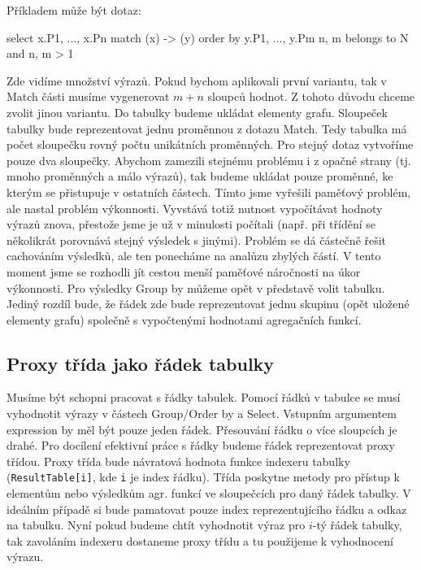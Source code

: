 \clearpage

Příkladem může být dotaz: 
\begin{code}
select x.P1, ..., x.Pn match (x) -> (y) order by y.P1, ..., y.Pm  
n, m belongs to N and n, m > 1
\end{code}

Zde vidíme množství výrazů.
Pokud bychom aplikovali první variantu, tak v Match části musíme vygenerovat $m + n$ sloupců hodnot.
Z tohoto důvodu chceme zvolit jinou variantu.
Do tabulky budeme ukládat elementy grafu.
Sloupeček tabulky bude reprezentovat jednu proměnnou z dotazu Match.
Tedy tabulka má počet sloupečku rovný počtu unikátních proměnných. 
Pro stejný dotaz vytvoříme pouze dva sloupečky.
Abychom zamezili stejnému problému i z opačné strany (tj. mnoho proměnných a málo výrazů), tak budeme ukládat pouze proměnné, ke kterým se přistupuje v ostatních částech.
Tímto jsme vyřešili paměťový problém, ale nastal problém výkonnosti.
Vyvstává totiž nutnost vypočítávat hodnoty výrazů znova, přestože jsme je už v minulosti počítali (např. při třídění se několikrát porovnává stejný výsledek s jinými).
Problém se dá částečně řešit cachováním výsledků, ale ten ponecháme na analůzu zbylých částí.
V tento moment jsme se rozhodli jít cestou menší paměťové náročnosti na úkor výkonnosti.
Pro výsledky Group by můžeme opět v představě volit tabulku.
Jediný rozdíl bude, že řádek zde bude reprezentovat jednu skupinu (opět uložené elementy grafu) společně s vypočtenými hodnotami agregačních funkcí.

\subsection{Proxy třída jako řádek tabulky}

Musíme být schopni pracovat s řádky tabulek.
Pomocí řádků v tabulce se musí vyhodnotit výrazy v částech Group/Order by a Select.
Vstupním argumentem expression by měl být pouze jeden řádek.
Přesouvání řádku o více sloupcích je drahé.
Pro docílení efektivní práce s řádky budeme řádek reprezentovat proxy třídou.
Proxy třída bude návratová hodnota funkce indexeru tabulky (\texttt{ResultTable[i]}, kde \texttt{i} je index řádku).
Třída poskytne metody pro přístup k elementům nebo výsledkům agr. funkcí ve sloupečcích pro daný řádek tabulky.
V ideálním případě si bude pamatovat pouze index reprezentujícího řádku a odkaz na tabulku.
Nyní pokud budeme chtít vyhodnotit výraz pro $i$-tý řádek tabulky, tak zavoláním indexeru dostaneme proxy třídu a tu použijeme k vyhodnocení výrazu.

